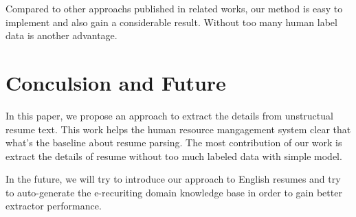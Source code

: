 \documentclass{acm_proc_article-sp}
\begin{document}
Compared to other approachs published in related works, our method is easy to implement and also gain a considerable result.
Without too many human label data is another advantage.


\section{Conculsion and Future}

In this paper, we propose an approach to extract the details from unstructual resume text. 
This work helps the human resource mangagement system clear that what's the baseline about resume parsing.
The most contribution of our work is extract the details of resume without too much labeled data with simple model.

In the future, we will try to introduce our approach to English resumes and try to auto-generate the e-recuriting domain knowledge base in order to gain better extractor performance.



 
\end{document}

